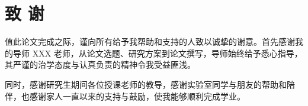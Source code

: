 \section*{致 谢}


值此论文完成之际，谨向所有给予我帮助和支持的人致以诚挚的谢意。首先感谢我的导师 XXX 老师，从论文选题、研究方案到论文撰写，导师始终给予悉心指导，其严谨的治学态度与认真负责的精神令我受益匪浅。


同时，感谢研究生期间各位授课老师的教导，感谢实验室同学与朋友的帮助和陪伴，也感谢家人一直以来的支持与鼓励，使我能够顺利完成学业。
